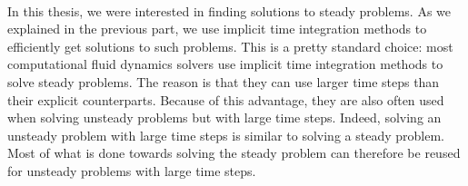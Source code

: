   \paragraph{}
  In this thesis, we were interested in finding solutions to steady problems.
  As we explained in the previous part, we use implicit time integration methods to efficiently get solutions to such problems.
  This is a pretty standard choice: most computational fluid dynamics solvers use implicit time integration methods to solve steady problems.
  The reason is that they can use larger time steps than their explicit counterparts.
  Because of this advantage, they are also often used when solving unsteady problems but with large time steps.
  Indeed, solving an unsteady problem with large time steps is similar to solving a steady problem.
  Most of what is done towards solving the steady problem can therefore be reused for unsteady problems with large time steps.

